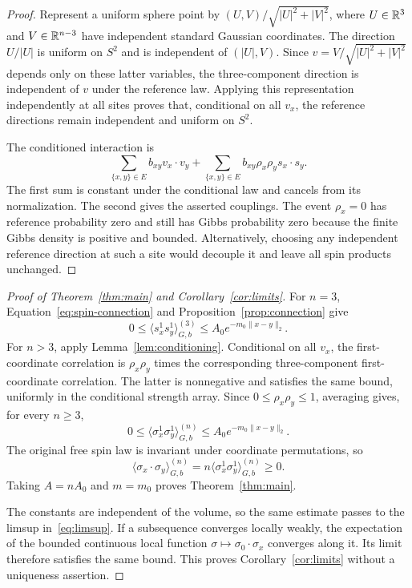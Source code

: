 \begin{proof}
Represent a uniform sphere point by
$(U,V)/\sqrt{|U|^2+|V|^2}$, where $U\in\mathbb R^3$ and
$V\in\mathbb R^{n-3}$ have independent standard Gaussian coordinates.
The direction $U/|U|$ is uniform on $S^2$ and is independent of
$(|U|,V)$. Since $v=V/\sqrt{|U|^2+|V|^2}$ depends only on these
latter variables, the three-component direction is independent of
$v$ under the reference law. Applying this representation independently
at all sites proves that, conditional on all $v_x$, the reference
directions remain independent and uniform on $S^2$.

The conditioned interaction is
\[
 \sum_{\{x,y\}\in E}b_{xy}v_x\cdot v_y
 +\sum_{\{x,y\}\in E}b_{xy}\rho_x\rho_y s_x\cdot s_y.
\]
The first sum is constant under the conditional law and cancels from
its normalization. The second gives the asserted couplings. The event
$\rho_x=0$ has reference probability zero and still has Gibbs
probability zero because the finite Gibbs density is positive and
bounded. Alternatively, choosing any independent reference direction
at such a site would decouple it and leave all spin products unchanged.
\end{proof}

\begin{proof}[Proof of Theorem~\ref{thm:main} and Corollary~\ref{cor:limits}]
For $n=3$, Equation~\eqref{eq:spin-connection} and
Proposition~\ref{prop:connection} give
\[
 0\leq\langle s_x^1s_y^1\rangle_{G,b}^{(3)}
 \leq A_0e^{-m_0\|x-y\|_2}.
\]
For $n>3$, apply Lemma~\ref{lem:conditioning}. Conditional on all
$v_x$, the first-coordinate correlation is $\rho_x\rho_y$ times
the corresponding three-component first-coordinate correlation.
The latter is nonnegative and satisfies the same bound, uniformly
in the conditional strength array. Since $0\leq\rho_x\rho_y\leq1$,
averaging gives, for every $n\ge3$,
\[
 0\leq\langle\sigma_x^1\sigma_y^1\rangle_{G,b}^{(n)}
 \leq A_0e^{-m_0\|x-y\|_2}.
\]
The original free spin law is invariant under coordinate permutations,
so
\[
 \langle\sigma_x\cdot\sigma_y\rangle_{G,b}^{(n)}
 =n\langle\sigma_x^1\sigma_y^1\rangle_{G,b}^{(n)}\geq0.
\]
Taking $A=nA_0$ and $m=m_0$ proves Theorem~\ref{thm:main}.

The constants are independent of the volume, so the same estimate
passes to the limsup in~\eqref{eq:limsup}. If a subsequence converges
locally weakly, the expectation of the bounded continuous local
function $\sigma\mapsto\sigma_0\cdot\sigma_x$ converges along it.
Its limit therefore satisfies the same bound. This proves
Corollary~\ref{cor:limits} without a uniqueness assertion.
\end{proof}
